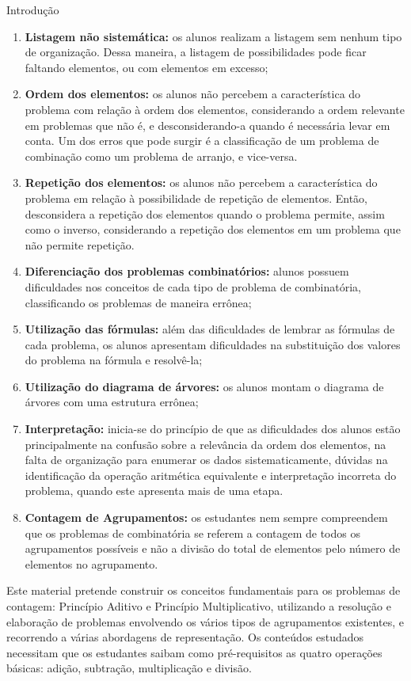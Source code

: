 \begin{apresentacao}{Introdução}
\begin{enumerate}
\item \textbf{Listagem não sistemática:} os alunos realizam a listagem sem nenhum tipo de organização. Dessa maneira, a listagem de possibilidades pode ficar faltando elementos, ou com elementos em excesso; 
\item \textbf{Ordem dos elementos: }os alunos não percebem a característica do problema com relação à ordem dos elementos, considerando a ordem relevante em problemas que não é, e desconsiderando-a quando é necessária levar em conta. Um dos erros que pode surgir é a classificação de um problema de combinação como um problema de arranjo, e vice-versa. 
\item \textbf{Repetição dos elementos:} os alunos não percebem a característica do problema em relação à possibilidade de repetição de elementos.  Então, desconsidera a repetição dos elementos quando o problema permite, assim como o inverso, considerando a repetição dos elementos em um problema que não permite repetição. 
\item \textbf{Diferenciação dos problemas combinatórios:} alunos possuem dificuldades nos conceitos de cada tipo de problema de combinatória, classificando os problemas de maneira errônea;
\item \textbf{Utilização das fórmulas:} além das dificuldades de lembrar as fórmulas de cada problema, os alunos apresentam dificuldades na substituição dos valores do problema na fórmula e resolvê-la;
\item \textbf{Utilização do diagrama de árvores:} os alunos montam o diagrama de árvores com uma estrutura errônea; 
\item \textbf{Interpretação:} inicia-se do princípio de que as dificuldades dos alunos estão principalmente na confusão sobre a relevância da ordem dos elementos, na falta de organização para enumerar os dados sistematicamente, dúvidas na identificação da operação aritmética equivalente e interpretação incorreta do problema, quando este apresenta mais de uma etapa.
\item \textbf{Contagem de Agrupamentos:} os estudantes nem sempre compreendem que os problemas de combinatória se referem a contagem de todos os agrupamentos possíveis e não a divisão do total de elementos pelo número de elementos no agrupamento.
\end{enumerate}

Este material pretende construir os conceitos fundamentais para os problemas de contagem:  Princípio Aditivo e Princípio Multiplicativo, utilizando a resolução e elaboração de problemas envolvendo os vários tipos de agrupamentos existentes, e recorrendo a várias abordagens de representação.  Os conteúdos estudados necessitam que os estudantes  saibam como pré-requisitos as quatro operações básicas: adição, subtração, multiplicação e divisão. 
 

\end{apresentacao}
